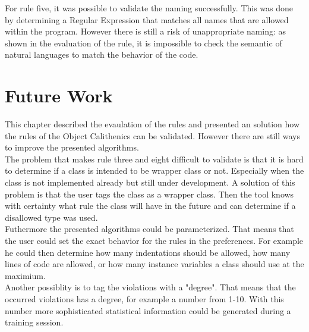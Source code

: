 For rule five, it was possible to validate the naming successfully. This was done by determining a Regular Expression that matches all names that are allowed within the program. However there is still a risk of unappropriate naming: as shown in the evaluation of the rule, it is impossible to check the semantic of natural languages to match the behavior of the code.

\section{Future Work}
\label{e:future}
This chapter described the evaulation of the rules and presented an solution how the rules of the Object Calithenics can be validated. However there are still ways to improve the presented algorithms. 
\\

The problem that makes rule three and eight difficult to validate is that it is hard to determine if a class is intended to be wrapper class or not. Especially when the class is not implemented already but still under development. 
A solution of this problem is that the user tags the class as a wrapper class. Then the tool knows with certainty what rule the class will have in the future and can determine if a disallowed type was used. 
\\

Futhermore the presented algorithms could be parameterized. That means that the user could set the exact behavior for the rules in the preferences. For example he could then determine how many indentations should be allowed, how many lines of code are allowed, or how many instance variables a class should use at the maximium.
\\

Another possiblity is to tag the violations with a "degree". That means that the occurred violations has a degree, for example a number from 1-10. With this number more sophisticated statistical information could be generated during a training session. 
\\
























